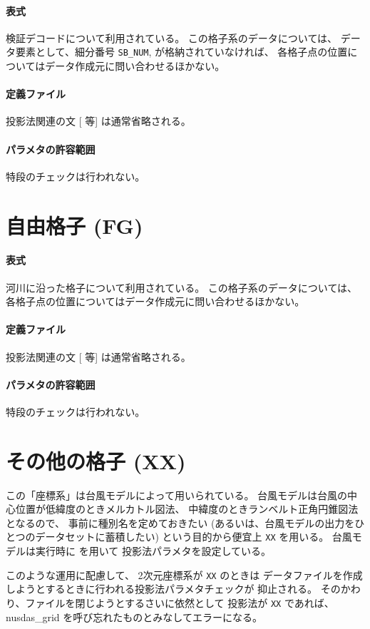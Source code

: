 \paragraph{表式}
検証デコードについて利用されている。
この格子系のデータについては、
データ要素として、細分番号
{\tt SB\_NUM},
が格納されていなければ、
各格子点の位置についてはデータ作成元に問い合わせるほかない。
\paragraph{定義ファイル}
投影法関連の文 [ 等] は通常省略される。
\paragraph{パラメタの許容範囲}
特段のチェックは行われない。

\section{自由格子 (FG)}
\paragraph{表式}
河川に沿った格子について利用されている。
この格子系のデータについては、
各格子点の位置についてはデータ作成元に問い合わせるほかない。
\paragraph{定義ファイル}
投影法関連の文 [ 等] は通常省略される。
\paragraph{パラメタの許容範囲}
特段のチェックは行われない。

\section{その他の格子 (XX)}
\label{sec:proj:XX}

この「座標系」は台風モデルによって用いられている。
台風モデルは台風の中心位置が低緯度のときメルカトル図法、
中緯度のときランベルト正角円錐図法となるので、
事前に種別名を定めておきたい
(あるいは、台風モデルの出力をひとつのデータセットに蓄積したい)
という目的から便宜上 {\tt XX} を用いる。
台風モデルは実行時に  を用いて
投影法パラメタを設定している。

このような運用に配慮して、
2次元座標系が {\tt XX} のときは
データファイルを作成しようとするときに行われる投影法パラメタチェックが
抑止される。
そのかわり、ファイルを閉じようとするさいに依然として
投影法が {\tt XX} であれば、
nusdas\_grid を呼び忘れたものとみなしてエラーになる。

